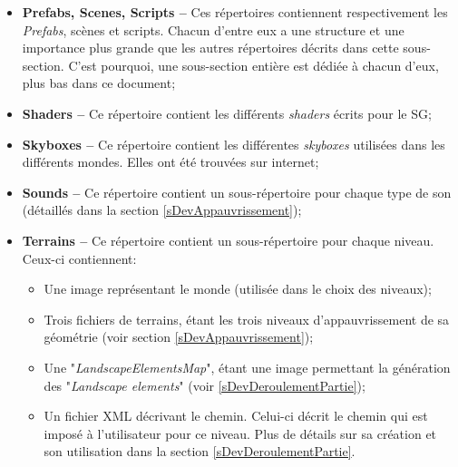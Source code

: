 \begin{itemize}
\begin{itemize}
			\end{itemize}
			\item \textbf{Prefabs, Scenes, Scripts --} Ces répertoires contiennent respectivement les \textit{Prefabs}, scènes et scripts. Chacun d'entre eux a une structure et une importance plus grande que les autres répertoires décrits dans cette sous-section. C'est pourquoi, une sous-section entière est dédiée à chacun d'eux, plus bas dans ce document;
			\item \textbf{Shaders --} Ce répertoire contient les différents \textit{shaders} écrits pour le SG;
			\item \textbf{Skyboxes --} Ce répertoire contient les différentes \textit{skyboxes} utilisées dans les différents mondes. Elles ont été trouvées sur internet;
			\item \textbf{Sounds --} Ce répertoire contient un sous-répertoire pour chaque type de son (détaillés dans la section \ref{sDevAppauvrissement});
			\item \textbf{Terrains --} Ce répertoire contient un sous-répertoire pour chaque niveau. Ceux-ci contiennent:
			\begin{itemize}
				\item Une image représentant le monde (utilisée dans le choix des niveaux);
				\item Trois fichiers de terrains, étant les trois niveaux d'appauvrissement de sa géométrie (voir section \ref{sDevAppauvrissement});
				\item Une "\textit{LandscapeElementsMap}", étant une image permettant la génération des "\textit{Landscape elements}" (voir \ref{sDevDeroulementPartie});
				\item Un fichier XML décrivant le chemin. Celui-ci décrit le chemin qui est imposé à l'utilisateur pour ce niveau. Plus de détails sur sa création et son utilisation dans la section \ref{sDevDeroulementPartie}.
			\end{itemize}
			

\end{itemize}
